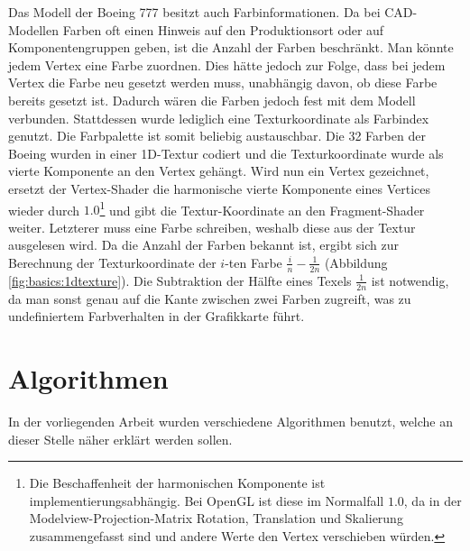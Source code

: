 Das Modell der Boeing 777 besitzt auch Farbinformationen. Da bei CAD-Modellen Farben oft einen Hinweis auf den Produktionsort oder auf Komponentengruppen geben, ist die Anzahl der Farben beschränkt. Man könnte jedem Vertex eine Farbe zuordnen. Dies hätte jedoch zur Folge, dass bei jedem Vertex die Farbe neu gesetzt werden muss, unabhängig davon, ob diese Farbe bereits gesetzt ist. Dadurch wären die Farben jedoch fest mit dem Modell verbunden. Stattdessen wurde lediglich eine Texturkoordinate als Farbindex genutzt. Die Farbpalette ist somit beliebig austauschbar. Die 32 Farben der Boeing wurden in einer 1D-Textur codiert und die Texturkoordinate wurde als vierte Komponente an den Vertex gehängt. Wird nun ein Vertex gezeichnet, ersetzt der Vertex-Shader die harmonische vierte Komponente eines Vertices wieder durch $1.0$\footnote{Die Beschaffenheit der harmonischen Komponente ist implementierungsabhängig. Bei OpenGL ist diese im Normalfall $1.0$, da in der Modelview-Projection-Matrix Rotation, Translation und Skalierung zusammengefasst sind und andere Werte den Vertex verschieben würden.} und gibt die Textur-Koordinate an den Fragment-Shader weiter. Letzterer muss eine Farbe schreiben, weshalb diese aus der Textur ausgelesen wird. Da die Anzahl der Farben bekannt ist, ergibt sich zur Berechnung der Texturkoordinate der $i$-ten Farbe $\frac{i}{n}-\frac{1}{2n}$ (Abbildung \ref{fig:basics:1dtexture}). Die Subtraktion der Hälfte eines Texels $\frac{1}{2n}$ ist notwendig, da man sonst genau auf die Kante zwischen zwei Farben zugreift, was zu undefiniertem Farbverhalten in der Grafikkarte führt.

\section{Algorithmen}
\label{sec:basics:algos}
In der vorliegenden Arbeit wurden verschiedene Algorithmen benutzt, welche an dieser Stelle näher erklärt werden sollen.

